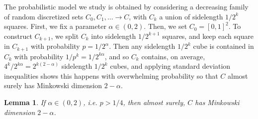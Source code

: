 \documentclass[dvipsnames]{article}
\theoremstyle{plain}
\newtheorem{lemma}{Lemma}
\theoremstyle{plain}
\begin{document}
The probabilistic model we study is obtained by considering a decreasing family of random discretized sets $C_0, C_1, \dots \to C$, with $C_k$ a union of sidelength $1/2^k$ squares. First, we fix a parameter $\alpha \in (0,2)$. Then, we set $C_0 = [0,1]^2$. To construct $C_{k+1}$, we split $C_k$ into sidelength $1/2^{k+1}$ squares, and keep each square in $C_{k+1}$ with probability $p = 1/2^\alpha$. Then any sidelength $1/2^k$ cube is contained in $C_k$ with probability $1/p^k = 1/2^{k \alpha}$, and so $C_k$ contains, on average, $4^k / 2^{k \alpha} = 2^{k(2 - \alpha)}$ sidelength $1/2^k$ cubes, and applying standard deviation inequalities shows this happens with overwhelming probability so that $C$ almost surely has Minkowski dimension $2 - \alpha$.

\begin{lemma}
	If $\alpha \in (0,2)$, i.e. $p > 1/4$, then almost surely, $C$ has Minkowski dimension $2 - \alpha$.
\end{lemma}
\end{document}
